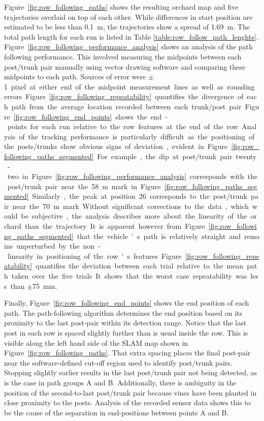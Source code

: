 \documentclass[preprint,authoryear,12pt]{elsarticle}
\begin{document}
    Figure~\ref{fig:row_following_paths} shows the resulting orchard map and five trajectories overlaid on top of each other.
    While differences in start position are estimated to be less than \SI{0.1}{\meter}, the trajectories show a spread of \SI{1.69}{\meter}.
    The total path length for each run is listed in Table \ref{table:row_follow_path_lenghts}.
    Figure~\ref{fig:row_following_performance_analysis} shows an analysis of the path following performance.
    This involved measuring the midpoints between each post/trunk pair manually using vector drawing software and comparing these midpoints to each path.
    Sources of error were $\pm$\SI{1} pixel at either end of the midpoint measurement lines as well as rounding errors.
    Figure~\ref{fig:row_following_repeatability} quantifies the divergence of each path from the average location recorded between each trunk/post pair.
    Figure~\ref{fig:row_following_end_points} shows the end-points for each run relative to the row features at the end of the row.

    Analysis of the tracking performance is particularly difficult as the positioning of the posts/trunks show obvious signs of deviation, evident in Figure~\ref{fig:row_following_paths_segmented}.
    For example, the dip at post/trunk pair twenty-two in Figure~\ref{fig:row_following_performance_analysis} corresponds with the post/trunk pair near the \SI{58}{\meter} mark in Figure~\ref{fig:row_following_paths_segmented}.
    Similarly, the peak at position 26 corresponds to the post/trunk pair near the \SI{70}{\meter} mark.
    Without significant corrections to the data, which would be subjective, the analysis describes more about the linearity of the orchard than the trajectory.
    It is apparent however from Figure~\ref{fig:row_following_paths_segmented} that the vehicle's path is relatively straight and remains unperturbed by the non-linearity in positioning of the row's features.

    Figure~\ref{fig:row_following_repeatability} quantifies the deviation between each trial relative to the mean path taken over the five trials.
    It shows that the worst case repeatability was less than $\pm$\SI{75}{\milli\meter}.

    Finally, Figure~\ref{fig:row_following_end_points} shows the end position of each path.
    The path-following algorithm determines the end position based on its proximity to the last post-pair within its detection range.
    Notice that the last post in each row is spaced slightly further than is usual inside the row.
    This is visible along the left hand side of the SLAM map shown in Figure~\ref{fig:row_following_paths}.
    That extra spacing places the final post-pair near the software-defined cut-off region used to identify post/trunk pairs.
    Stopping slightly earlier results in the last post/trunk pair not being detected, as is the case in path groups A and B.
    Additionally, there is ambiguity in the position of the second-to-last post/trunk pair because vines have been planted in close proximity to the posts.
    Analysis of the recorded sensor data shows this to be the cause of the separation in end-positions between points A and B.
\end{document}
